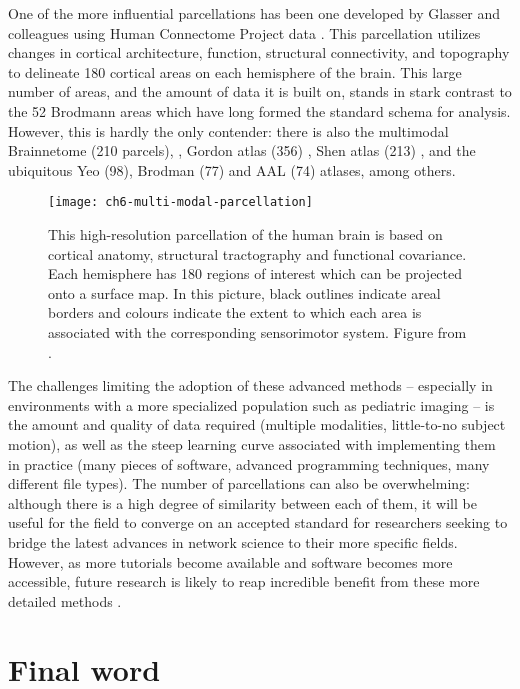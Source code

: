 One of the more influential parcellations has been one developed by Glasser and colleagues using Human Connectome Project data \citep{Glasser2016}. This parcellation utilizes changes in cortical architecture, function, structural connectivity, and topography to delineate 180 cortical areas on each hemisphere of the brain. This large number of areas, and the amount of data it is built on, stands in stark contrast to the 52 Brodmann areas which have long formed the standard schema for analysis. However, this is hardly the only contender: there is also the multimodal Brainnetome (210 parcels), \citep{Fan2016}, Gordon atlas (356) \citep{Gordon2016}, Shen atlas (213) \citep{Shen2013}, and the ubiquitous Yeo (98), Brodman (77) and AAL (74) atlases, among others. 

\begin{figure}[t]
	\centering
	\texttt{[image: ch6-multi-modal-parcellation]}
	\caption[Multi-modal parcellation of the human brain]{This high-resolution parcellation of the human brain is based on cortical anatomy, structural tractography and functional covariance. Each hemisphere has 180 regions of interest which can be projected onto a surface map. In this picture, black outlines indicate areal borders and colours indicate the extent to which each area is associated with the corresponding sensorimotor system. Figure from \citep{Glasser2016}.}
	\label{fig:ch6-multi-modal-parcellation}
\end{figure}

The challenges limiting the adoption of these advanced methods -- especially in environments with a more specialized population such as pediatric imaging -- is the amount and quality of data required (multiple modalities, little-to-no subject motion), as well as the steep learning curve associated with implementing them in practice (many pieces of software, advanced programming techniques, many different file types). The number of parcellations can also be overwhelming: although there is a high degree of similarity between each of them, it will be useful for the field to converge on an accepted standard for researchers seeking to bridge the latest advances in network science to their more specific fields. However, as more tutorials become available and software becomes more accessible, future research is likely to reap incredible benefit from these more detailed methods \citep{Poldrack2015}.

\section{Final word}

